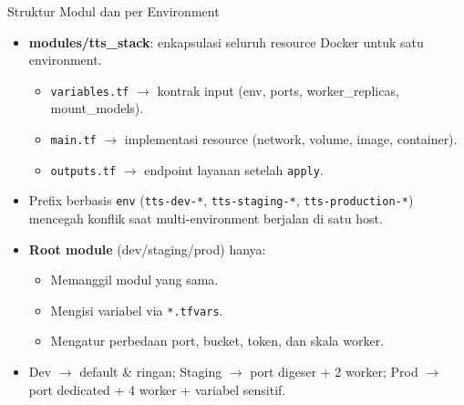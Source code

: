 \documentclass[aspectratio=169, table]{beamer}
\begin{document}
\begin{frame}{Struktur Modul dan per Environment}
\vspace{10pt}
\begin{itemize}
    \item \textbf{modules/tts\_stack}: enkapsulasi seluruh resource Docker untuk satu environment.
    \begin{itemize}
        \item \texttt{variables.tf} $\rightarrow$ kontrak input (env, ports, worker\_replicas, mount\_models).
        \item \texttt{main.tf} $\rightarrow$ implementasi resource (network, volume, image, container).
        \item \texttt{outputs.tf} $\rightarrow$ endpoint layanan setelah \texttt{apply}.
    \end{itemize}
    \item Prefix berbasis \texttt{env} (\texttt{tts-dev-*}, \texttt{tts-staging-*}, \texttt{tts-production-*})
          mencegah konflik saat multi-environment berjalan di satu host.
    \item \textbf{Root module} (dev/staging/prod) hanya:
    \begin{itemize}
        \item Memanggil modul yang sama.
        \item Mengisi variabel via \texttt{*.tfvars}.
        \item Mengatur perbedaan port, bucket, token, dan skala worker.
    \end{itemize}
    \item Dev $\rightarrow$ default \& ringan;  
          Staging $\rightarrow$ port digeser + 2 worker;  
          Prod $\rightarrow$ port dedicated + 4 worker + variabel sensitif.
\end{itemize}
\end{frame}
\end{document}
